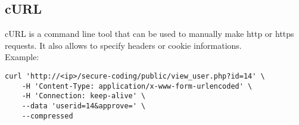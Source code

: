 \subsection{cURL}
cURL is a command line tool that can be used to manually make http or https requests. It also allows to specify headers or cookie informations.\\
Example:
\begin{lstlisting}
curl 'http://<ip>/secure-coding/public/view_user.php?id=14' \
    -H 'Content-Type: application/x-www-form-urlencoded' \
    -H 'Connection: keep-alive' \
    --data 'userid=14&approve=' \
    --compressed
\end{lstlisting}
